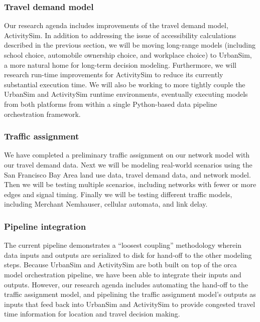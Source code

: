 \subsubsection{Travel demand model}

Our research agenda includes improvements of the travel demand model, ActivitySim. In addition to addressing the issue of accessibility calculations described in the previous section, we will be moving long-range models (including school choice, automobile ownership choice, and workplace choice) to UrbanSim, a more natural home for long-term decision modeling. Furthermore, we will research run-time improvements for ActivitySim to reduce its currently substantial execution time. We will also be working to more tightly couple the UrbanSim and ActivitySim runtime environments, eventually executing models from both platforms from within a single Python-based data pipeline orchestration framework. 

\subsubsection{Traffic assignment}

We have completed a preliminary traffic assignment on our network model with our travel demand data. Next we will be modeling real-world scenarios using the San Francisco Bay Area land use data, travel demand data, and network model. Then we will be testing multiple scenarios, including networks with fewer or more edges and signal timing. Finally we will be testing different traffic models, including Merchant Nemhauser, cellular automata, and link delay.

\subsubsection{Pipeline integration}

The current pipeline demonstrates a \enquote{loosest coupling} methodology wherein data inputs and outputs are serialized to disk for hand-off to the other modeling steps. Because UrbanSim and ActivitySim are both built on top of the orca model orchestration pipeline, we have been able to integrate their inputs and outputs. However, our research agenda includes automating the hand-off to the traffic assignment model, and pipelining the traffic assignment model's outputs as inputs that feed back into UrbanSim and ActivitySim to provide congested travel time information for location and travel decision making.

